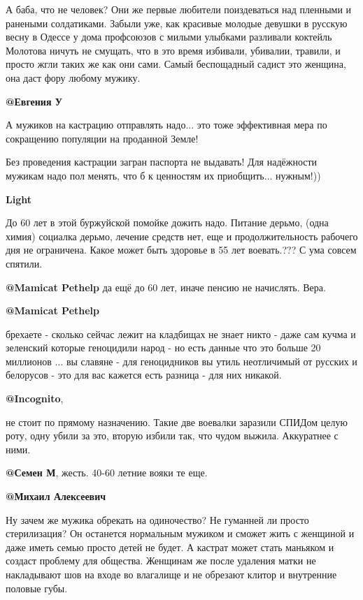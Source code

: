 \begin{itemize}

А баба, что не человек? Они же первые любители поиздеваться над пленными и
ранеными солдатиками. Забыли уже, как красивые молодые девушки в русскую весну
в Одессе у дома профсоюзов  с милыми улыбками  разливали коктейль Молотова
ничуть не смущать, что в это время избивали, убивалии, травили, и просто жгли
таких же как они сами. Самый беспощадный садист это женщина, она даст фору
любому мужику. 

\textbf{@Евгения У}  

А мужиков на кастрацию отправлять надо... это тоже эффективная мера по
сокращению популяции на проданной Земле!

Без проведения кастрации загран паспорта не выдавать! Для надёжности мужикам
надо пол менять, что б к ценностям их приобщить... нужным!))

\textbf{Light}  

До 60 лет в этой буржуйской помойке дожить надо.  Питание дерьмо, (одна химия)
социалка дерьмо, лечение средств нет, еще и продолжительность рабочего дня не
ограничена.  Какое может быть здоровье в 55 лет воевать.???  С ума совсем
спятили.

\textbf{@Mamicat Pethelp}  да ещё до 60 лет, иначе пенсию не начислять. Вера. 

\textbf{@Mamicat Pethelp}  

брехаете - сколько сейчас лежит на кладбищах не знает никто - даже сам кучма
и зеленский которые геноцидили народ   - но есть данные что это больше 20
миллионов ... вы славяне - для геноцидников вы утиль неотличимый от русских и
белорусов - это для вас кажется есть разница - для них никакой.

\textbf{@Incognito}, 

не стоит по прямому назначению. Такие две воевалки заразили СПИДом целую роту,
одну убили за это, вторую избили так, что чудом выжила. Аккуратнее с ними.

\textbf{@Семен М}, жесть. 40-60 летние вояки те еще.

\textbf{@Михаил Алексеевич}  

Ну зачем же мужика обрекать на одиночество? Не гуманней ли просто
стерилизация? Он останется нормальным мужиком и сможет жить с женщиной и даже
иметь семью просто детей не будет. А кастрат может стать маньяком и создаст
проблему для общества. Женщинам же после удаления матки не накладывают шов на
входе во влагалище и не обрезают клитор и внутренние половые губы. 


\end{itemize}

